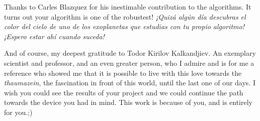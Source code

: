 \documentclass[11pt, a4paper, twoside]{article} %
\begin{document}
Thanks to Carles Blazquez for his inestimable contribution to the algorithms. It turns out your algorithm is one of the robustest! {\em ¡Quizá algún día descubras el color del cielo de uno de los exoplanetas que estudias con tu propio algoritmo! ¡Espero estar ahí cuando suceda!}

And of course, my deepest gratitude to Todor Kirilov Kalkandjiev. An exemplary scientist and professor, and an even greater person, who I admire and is for me a reference who showed me that it is possible to live with this love towards the {\em thaumazein}, the fascination in front of this world, until the last one of our days. I wish you could see the results of your project and we could continue the path towards the device you had in mind. This work is because of you, and is entirely for you.\vspace{0.1cm};)



\newpage

\fancyhead[OR]{ }

\fancyhead[EL]{\em }

\newpage
\fancyhead[OL]{}
\fancyhead[OR]{}
\fancyhead[EL]{}
\fancyhead[ER]{}
\null
\end{document}
